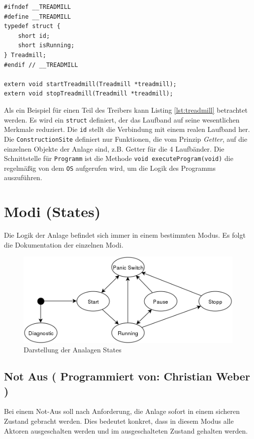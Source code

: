 \documentclass[fontsize=11pt,a4paper,final]{scrartcl}[2003/01/01]
\makeatletter
\def\ScaleIfNeeded{%
	\ifdim\Gin@nat@width>\linewidth
		\linewidth
	\else
		\Gin@nat@width
	\fi
}
\newcommand*{\chris}{%
	Programmiert von: Christian Weber
}
\makeatother
\begin{document}
\begin{lstlisting}[caption={Beispiel: Treiber für Laufband},label={lst:treadmill}]
#ifndef __TREADMILL
#define __TREADMILL
typedef struct {
    short id;
    short isRunning;
} Treadmill;
#endif // __TREADMILL

extern void startTreadmill(Treadmill *treadmill);
extern void stopTreadmill(Treadmill *treadmill);
\end{lstlisting}
Als ein Beispiel für einen Teil des Treibers kann Listing \ref{lst:treadmill} betrachtet werden. Es wird ein \lstinline|struct| definiert, der das Laufband auf seine wesentlichen Merkmale reduziert. Die \lstinline|id| stellt die Verbindung mit einem realen Laufband her. Die \lstinline|ConstructionSite| definiert nur Funktionen, die vom Prinzip \textit{Getter}, auf die einzelnen Objekte der Anlage sind, z.B. Getter für die 4 Laufbänder. Die Schnittstelle für \lstinline|Programm| ist die Methode \lstinline|void executeProgram(void)| die regelmäßig von dem \lstinline|OS| aufgerufen wird, um die Logik des Programms auszuführen.


\section{Modi (States)}
Die Logik der Anlage befindet sich immer in einem bestimmten Modus. Es folgt die Dokumentation der einzelnen Modi.
\begin{figure}[H]
	\centering
	\includegraphics[width=1\ScaleIfNeeded]{Bilder/StateAutomat.png}
	\caption{Darstellung der Analagen States}
	\label{fig:Automat}
\end{figure}

\subsection{Not Aus (\chris)}
Bei einem Not-Aus soll nach Anforderung, die Anlage sofort in einem sicheren Zustand gebracht werden. Dies bedeutet konkret, dass in diesem Modus alle Aktoren ausgeschalten werden und im ausgeschalteten Zustand gehalten werden.
\end{document}
